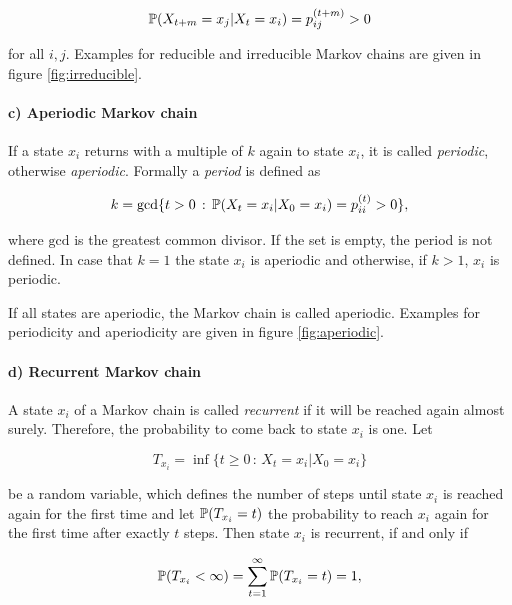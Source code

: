 \begin{equation}
\mathbb{P}(X_{t+m} = x_j | X_t = x_i) = p_{ij}^{(t+m)} > 0
\end{equation}

for all $i,j$. Examples for reducible and irreducible Markov chains are given in figure \ref{fig:irreducible}.

\paragraph{c) Aperiodic Markov chain}

If a state $x_i$ returns with a multiple of $k$ again to state $x_i$, it is called \emph{periodic}, otherwise \emph{aperiodic}. Formally a \emph{period} is defined as

\begin{equation}
k = \text{gcd} \{ t > 0\,:\,\mathbb{P}(X_t = x_i | X_0 = x_i) = p_{ii}^{(t)} > 0 \},
\end{equation}

where $\text{gcd}$ is the greatest common divisor. If the set is empty, the period is not defined. In case that $k=1$ the state $x_i$ is aperiodic and otherwise, if $k>1$, $x_i$ is periodic.

If all states are aperiodic, the Markov chain is called aperiodic. Examples for periodicity and aperiodicity are given in figure \ref{fig:aperiodic}.

\paragraph{d) Recurrent Markov chain}

A state $x_i$ of a Markov chain is called \emph{recurrent} if it  will be reached again almost surely. Therefore, the probability to come back to state $x_i$ is one. Let

\begin{equation}
\label{eq:first-comeback}
T_{x_i} = \inf\{ t \ge 0 \,:\, X_t = x_i | X_0 = x_i \}
\end{equation}


be a random variable, which defines the number of steps until state $x_i$ is reached again for the first time and let $\mathbb{P}(T_{x_i} = t)$ the probability to reach $x_i$ again for the first time after exactly $t$ steps. Then state $x_i$ is recurrent, if and only if

\begin{equation}
\label{eq:recurrent}
\mathbb{P}(T_{x_i} < \infty) = \sum_{t=1}^\infty \mathbb{P}(T_{x_i} = t) = 1,
\end{equation}

